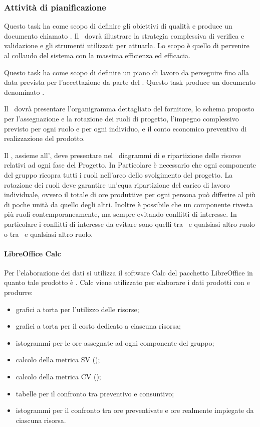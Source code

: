 \documentclass[12pt,a4paper]{article}
\begin{document}
\subsubsection{Attività di pianificazione}

Questo task ha come scopo di definire gli obiettivi di qualità e produce un documento chiamato \PdQ. Il \PdQ\ dovrà illustrare la strategia complessiva di verifica e validazione e gli strumenti utilizzati per attuarla. Lo scopo è quello di pervenire al collaudo del sistema con la massima efficienza ed efficacia.

Questo task ha come scopo di definire un piano di lavoro da perseguire fino alla data prevista per l'accettazione da parte del . Questo task produce un documento denominato \PdP.

Il \PdP\ dovrà presentare l'organigramma dettagliato del fornitore, lo schema proposto per l'assegnazione e la rotazione dei ruoli di progetto, l'impegno complessivo previsto per ogni ruolo e per ogni individuo, e il conto economico preventivo di realizzazione del prodotto.

Il \PM, assieme all'\AM, deve presentare nel \PdP\ diagrammi di  e ripartizione delle risorse relativi ad ogni fase del Progetto. In Particolare è necessario che ogni componente del gruppo ricopra tutti i ruoli nell'arco dello svolgimento del progetto. La rotazione dei ruoli deve garantire un'equa ripartizione del carico di lavoro individuale, ovvero il totale di ore produttive per ogni persona può differire al più di poche unità da quello degli altri. Inoltre è possibile che un componente rivesta più ruoli contemporaneamente, ma sempre evitando conflitti di interesse. In particolare i conflitti di interesse da evitare sono quelli tra \PM\ e qualsiasi altro ruolo o tra \VR\ e qualsiasi altro ruolo.


\paragraph{LibreOffice Calc}
Per l’elaborazione dei dati si utilizza il software Calc del pacchetto LibreOffice in quanto tale prodotto è . Calc viene utilizzato per elaborare i dati prodotti con  e produrre:
\begin{itemize}
	\item grafici a torta per l’utilizzo delle risorse;
	\item grafici a torta per il costo dedicato a ciascuna risorsa;
	\item istogrammi per le ore assegnate ad ogni componente del gruppo;
	\item calcolo della metrica SV ();
	\item calcolo della metrica CV ();
	\item tabelle per il confronto tra preventivo e consuntivo;
	\item istogrammi per il confronto tra ore preventivate e ore realmente impiegate da ciascuna risorsa.
\end{itemize}
\end{document}

